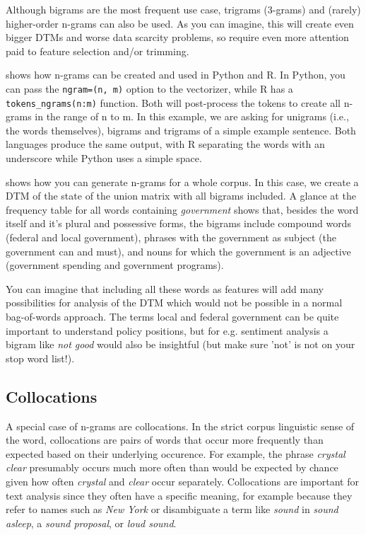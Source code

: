 Although bigrams are the most frequent use case, trigrams (3-grams) and (rarely) higher-order n-grams can also be used.
As you can imagine, this will create even bigger DTMs and worse data scarcity problems,
so require even more attention paid to feature selection and/or trimming.



 shows how n-grams can be created and used in Python and R.
In Python, you can pass the \verb|ngram=(n, m)| option to the vectorizer,
while R has a \verb|tokens_ngrams(n:m)| function.
Both will post-process the tokens to create all n-grams in the range of n to m.
In this example, we are asking for unigrams (i.e., the words themselves), bigrams and trigrams of a simple example sentence.
Both languages produce the same output, with R separating the words with an underscore while Python uses a simple space.


 shows how you can generate n-grams for a whole corpus.
In this case, we create a DTM of the state of the union matrix with all bigrams included.
A glance at the frequency table for all words containing \emph{government} shows that,
besides the word itself and it's plural and possessive forms, the bigrams include compound words (federal and local government),
phrases with  the government as subject (the government can and must), and nouns for which the government is an adjective
(government spending and government programs).

You can imagine that including all these words as features will add many possibilities for analysis of the DTM
which would not be possible in a normal bag-of-words approach.
The terms local and federal government can be quite important to understand policy positions,
but for e.g. sentiment analysis a bigram like \emph{not good} would also be insightful
(but make sure 'not' is not on your stop word list!).   

\subsection{Collocations}

A special case of n-grams are collocations.
In the strict corpus linguistic sense of the word, collocations are pairs of words that occur more frequently than expected
based on their underlying occurence.
For example, the phrase \emph{crystal clear} presumably occurs much more often than would be expected by chance given
how often \emph{crystal} and \emph{clear} occur separately.
Collocations are important for text analysis since they often have a specific meaning,
for example because they refer to names such as \emph{New York} or disambiguate a term like \emph{sound} in \emph{sound asleep},
a \emph{sound proposal}, or \emph{loud sound}.

